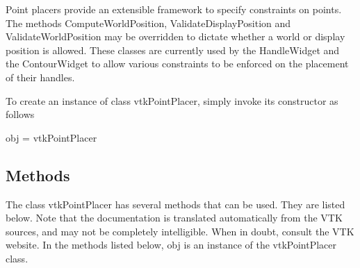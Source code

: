 Point placers provide an extensible framework to specify constraints on points. The methods Compute\-World\-Position, Validate\-Display\-Position and Validate\-World\-Position may be overridden to dictate whether a world or display position is allowed. These classes are currently used by the Handle\-Widget and the Contour\-Widget to allow various constraints to be enforced on the placement of their handles.

To create an instance of class vtk\-Point\-Placer, simply invoke its constructor as follows \begin{DoxyVerb}  obj = vtkPointPlacer
\end{DoxyVerb}
 \hypertarget{vtkwidgets_vtkxyplotwidget_Methods}{}\subsection{Methods}\label{vtkwidgets_vtkxyplotwidget_Methods}
The class vtk\-Point\-Placer has several methods that can be used. They are listed below. Note that the documentation is translated automatically from the V\-T\-K sources, and may not be completely intelligible. When in doubt, consult the V\-T\-K website. In the methods listed below, {\ttfamily obj} is an instance of the vtk\-Point\-Placer class. 
